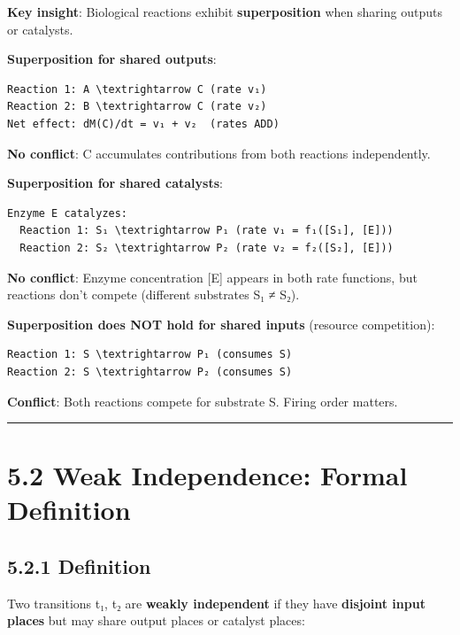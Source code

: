 \textbf{Key insight}: Biological reactions exhibit
\textbf{superposition} when sharing outputs or catalysts.

\textbf{Superposition for shared outputs}:

\begin{lstlisting}
Reaction 1: A \textrightarrow C (rate v₁)
Reaction 2: B \textrightarrow C (rate v₂)
Net effect: dM(C)/dt = v₁ + v₂  (rates ADD)
\end{lstlisting}

\textbf{No conflict}: C accumulates contributions from both reactions
independently.

\textbf{Superposition for shared catalysts}:

\begin{lstlisting}
Enzyme E catalyzes:
  Reaction 1: S₁ \textrightarrow P₁ (rate v₁ = f₁([S₁], [E]))
  Reaction 2: S₂ \textrightarrow P₂ (rate v₂ = f₂([S₂], [E]))
\end{lstlisting}

\textbf{No conflict}: Enzyme concentration {[}E{]} appears in both rate
functions, but reactions don't compete (different substrates S₁ ≠ S₂).

\textbf{Superposition does NOT hold for shared inputs} (resource
competition):

\begin{lstlisting}
Reaction 1: S \textrightarrow P₁ (consumes S)
Reaction 2: S \textrightarrow P₂ (consumes S)
\end{lstlisting}

\textbf{Conflict}: Both reactions compete for substrate S. Firing order
matters.

\begin{center}\rule{0.5\linewidth}{0.5pt}\end{center}

\hypertarget{weak-independence-formal-definition}{%
\section{5.2 Weak Independence: Formal
Definition}\label{weak-independence-formal-definition}}

\hypertarget{definition}{%
\subsection{5.2.1 Definition}\label{definition}}

Two transitions t₁, t₂ are \textbf{weakly independent} if they have
\textbf{disjoint input places} but may share output places or catalyst
places:

